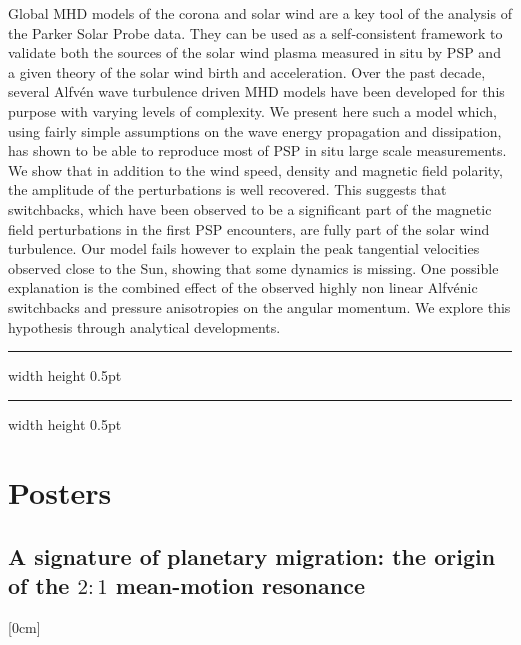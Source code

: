 \documentclass[a4paper,11pt]{book}
\def\doubleline{
\hrule width \hsize height 0.5pt  \kern 1mm \hrule width \hsize height 0.5pt 
}
\begin{document}
  
\vspace{2 mm}
\noindent 
Global MHD models of the corona and solar wind are a key tool of the analysis of the Parker Solar Probe data. They can be used as a self-consistent framework to validate both the sources of the solar wind plasma measured in situ by PSP and a given theory of the solar wind birth and acceleration. Over the past decade, several Alfvén wave turbulence driven MHD models have been developed for this purpose with varying levels of complexity. We present here such a model which, using fairly simple assumptions on the wave energy propagation and dissipation, has shown to be able to reproduce most of PSP in situ large scale measurements. We show that in addition to the wind speed, density and magnetic field polarity, the amplitude of the perturbations is well recovered. This suggests that switchbacks, which have been observed to be a significant part of the magnetic field perturbations in the first PSP encounters, are fully part of the solar wind turbulence. Our model fails however to explain the peak tangential velocities observed close to the Sun, showing that some dynamics is missing. One possible explanation is the combined effect of the observed highly non linear Alfvénic switchbacks and pressure anisotropies on the angular momentum. We explore this hypothesis through analytical developments. 


\noindent\doubleline
        



\chapter*{Posters}
        
          \section[A signature of planetary migration: the origin of the $2:1$ mean-motion resonance \newline(R. Murray-Clay)] { A signature of planetary migration: the origin of the $2:1$ mean-motion resonance }



[0cm]
\end{document}

